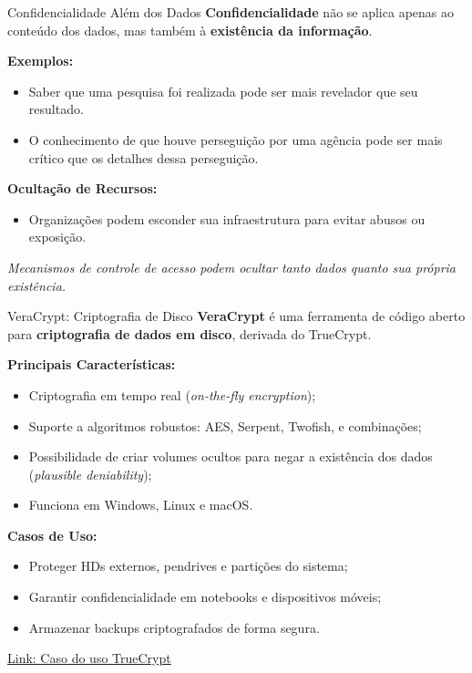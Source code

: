 \begin{frame}{Confidencialidade Além dos Dados}
    \textbf{Confidencialidade} não se aplica apenas ao conteúdo dos dados, mas também à \textbf{existência da informação}.

    \vspace{0.3cm}
    \textbf{Exemplos:}
    \begin{itemize}
        \item Saber que uma pesquisa foi realizada pode ser mais revelador que seu resultado.
        \item O conhecimento de que houve perseguição por uma agência pode ser mais crítico que os detalhes dessa perseguição.
    \end{itemize}

    \vspace{0.3cm}
    \textbf{Ocultação de Recursos:}
    \begin{itemize}
        \item Organizações podem esconder sua infraestrutura para evitar abusos ou exposição.

    \end{itemize}

    \vspace{0.3cm}
    \textit{Mecanismos de controle de acesso podem ocultar tanto dados quanto sua própria existência.}
\end{frame}

\begin{frame}{VeraCrypt: Criptografia de Disco}
    \textbf{VeraCrypt} é uma ferramenta de código aberto para \textbf{criptografia de dados em disco}, derivada do TrueCrypt.

    \vspace{0.3cm}
    \textbf{Principais Características:}
    \begin{itemize}
        \item Criptografia em tempo real (\textit{on-the-fly encryption});
        \item Suporte a algoritmos robustos: AES, Serpent, Twofish, e combinações;
        \item Possibilidade de criar volumes ocultos para negar a existência dos dados (\textit{plausible deniability});
        \item Funciona em Windows, Linux e macOS.
    \end{itemize}

    \vspace{0.3cm}
    \textbf{Casos de Uso:}
    \begin{itemize}
        \item Proteger HDs externos, pendrives e partições do sistema;
        \item Garantir confidencialidade em notebooks e dispositivos móveis;
        \item Armazenar backups criptografados de forma segura.
    \end{itemize}

    \href{https://g1.globo.com/politica/noticia/2010/06/nem-fbi-consegue-decifrar-arquivos-de-daniel-dantas-diz-jornal.html}{Link: Caso do uso TrueCrypt}
\end{frame}



